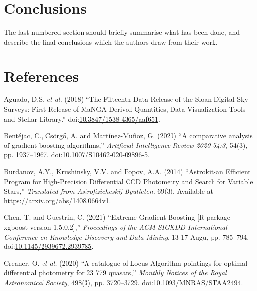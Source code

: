 \documentclass[a4paper,fleqn,usenatbib]{mnras}
\newlength{\cslhangindent}
\newlength{\cslentryspacingunit} %
\newenvironment{CSLReferences}[2] %
 {%
  \setlength{\parindent}{0pt}
  \ifodd #1
  \let\oldpar\par
  \def\par{\hangindent=\cslhangindent\oldpar}
  \fi
  \setlength{\parskip}{#2\cslentryspacingunit}
 }%
 {}
\begin{document}
\hypertarget{conclusions}{%
\section{Conclusions}\label{conclusions}}

The last numbered section should briefly summarise what has been done,
and describe the final conclusions which the authors draw from their
work.

\hypertarget{references}{%
\section*{References}\label{references}}

\hypertarget{refs}{}
\begin{CSLReferences}{0}{0}
\leavevmode{}%
Aguado, D.S. \emph{et al.} (2018) {``{The Fifteenth Data Release of the
Sloan Digital Sky Surveys: First Release of MaNGA Derived Quantities,
Data Visualization Tools and Stellar Library}.''}
doi:\href{https://doi.org/10.3847/1538-4365/aaf651}{10.3847/1538-4365/aaf651}.

\leavevmode{}%
Bentéjac, C., Csörgő, A. and Martínez-Muñoz, G. (2020) {``{A comparative
analysis of gradient boosting algorithms},''} \emph{Artificial
Intelligence Review 2020 54:3}, 54(3), pp. 1937--1967.
doi:\href{https://doi.org/10.1007/S10462-020-09896-5}{10.1007/S10462-020-09896-5}.

\leavevmode{}%
Burdanov, A.Y., Krushinsky, V.V. and Popov, A.A. (2014) {``{Astrokit-an
Efficient Program for High-Precision Differential CCD Photometry and
Search for Variable Stars},''} \emph{Translated from Astrofizicheskij
Byulleten}, 69(3). Available at:
\url{https://arxiv.org/abs/1408.0664v1}.

\leavevmode{}%
Chen, T. and Guestrin, C. (2021) {``{Extreme Gradient Boosting {[}R
package xgboost version 1.5.0.2{]}},''} \emph{Proceedings of the ACM
SIGKDD International Conference on Knowledge Discovery and Data Mining},
13-17-Augu, pp. 785--794.
doi:\href{https://doi.org/10.1145/2939672.2939785}{10.1145/2939672.2939785}.

\leavevmode{}%
Creaner, O. \emph{et al.} (2020) {``{A catalogue of Locus Algorithm
pointings for optimal differential photometry for 23 779 quasars},''}
\emph{Monthly Notices of the Royal Astronomical Society}, 498(3), pp.
3720--3729.
doi:\href{https://doi.org/10.1093/MNRAS/STAA2494}{10.1093/MNRAS/STAA2494}.


\end{CSLReferences}
\end{document}
